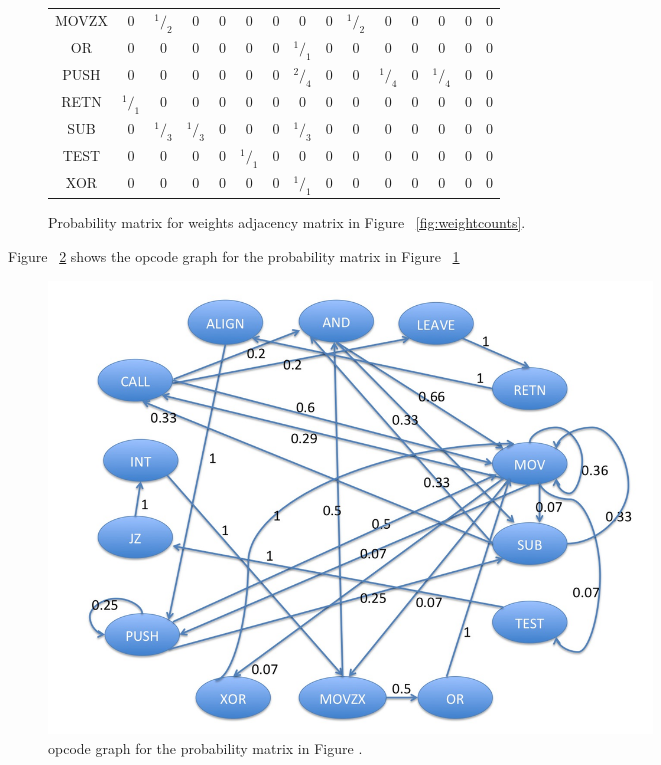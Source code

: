 \begin{figure}[h]
\begin{tabular}{c|cccccccccccccc}
MOVZX&  0&$^1/_2$& 0&  0& 0&  0&  0&  0&  $^1/_2$&  0&  0&  0&  0& 0 \\
OR&  0&0&0&  0& 0&  0&  $^1/_1$& 0&  0&  0&  0&  0&  0& 0 \\
PUSH&0&0&0&  0& 0&  0&  $^2/_4$& 0&  0&  $^1/_4$&  0&$^1/_4$& 0&  0 \\
RETN&  $^1/_1$& 0&  0&  0& 0& 0&  0&  0&  0& 0&  0& 0&  0& 0 \\
SUB& 0&$^1/_3$& $^1/_3$& 0&  0&  0& $^1/_3$& 0& 0&  0&  0& 0&  0& 0 \\
TEST&0&0&0&  0& $^1/_1$& 0&  0&  0&  0&  0&  0& 0&  0& 0 \\
XOR& 0&0&0&  0&  0&  0&  $^1/_1$&  0&  0&  0&  0&  0&  0&  0 \\
\end{tabular}
    \caption[Probability matrix for weights adjacency matrix]{Probability matrix for weights adjacency matrix in Figure ~\ref{fig:weightcounts}.}
    \label{fig:probabilitymatrix}
\end{figure}

Figure ~\ref{fig:opcodegraph} shows the opcode graph for the probability matrix in Figure ~\ref{fig:probabilitymatrix} 

\begin{figure}[h]
  \centering
      \includegraphics[width=16cm, height=12cm]{opcodegraph.jpg}
    \caption[Opcode Graph]{opcode graph for the probability matrix in Figure \cite{bib8}.}
    \label{fig:opcodegraph}
\end{figure}

